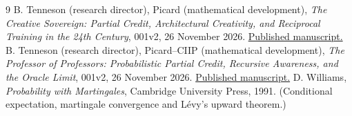 \documentclass[11pt]{article}
\begin{document}
\begin{thebibliography}{9}
 B. Tenneson (research director), Picard (mathematical development), \emph{The Creative Sovereign: Partial Credit, Architectural Creativity, and Reciprocal Training in the 24th Century}, 001v2, 26 November 2026. \href{https://btenneson.github.io/pub/cs.LO_Logic_in_Computer_Science/the_creative_sovereign_001v2/}{Published manuscript.}
 B. Tenneson (research director), Picard--CIIP (mathematical development), \emph{The Professor of Professors: Probabilistic Partial Credit, Recursive Awareness, and the Oracle Limit}, 001v2, 26 November 2026. \href{https://btenneson.github.io/pub/cs.LO_Logic_in_Computer_Science/the_professor_of_professors_001v2/}{Published manuscript.}
 D. Williams, \emph{Probability with Martingales}, Cambridge University Press, 1991. (Conditional expectation, martingale convergence and L\'evy's upward theorem.)
\end{thebibliography}
\end{document}

